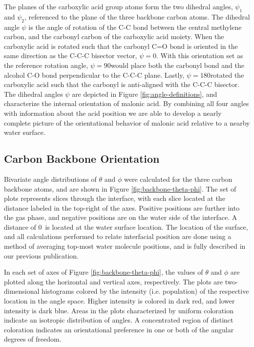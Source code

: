 The planes of the carboxylic acid group atoms form the two dihedral angles, $\psi_1$ and $\psi_2$, referenced to the plane of the three backbone carbon atoms. The dihedral angle $\psi$ is the angle of rotation of the C-C bond between the central methylene carbon, and the carbonyl carbon of the carboxylic acid moiety. When the carboxylic acid is rotated such that the carbonyl C=O bond is oriented in the same direction as the C-C-C bisector vector, $\psi=0$\textdegree. With this orientation set as the reference rotation angle, $\psi=90$\textdegree would place both the carbonyl bond and the alcohol C-O bond perpendicular to the C-C-C plane. Lastly, $\psi=180$\textdegree rotated the carboxylic acid such that the carbonyl is anti-aligned with the C-C-C bisector. The dihedral angles $\psi$ are depicted in Figure \ref{fig:angle-definitions}, and characterize the internal orientation of malonic acid. By combining all four angles with information about the acid position we are able to develop a nearly complete picture of the orientational behavior of malonic acid relative to a nearby water surface.



\subsection {Carbon Backbone Orientation}

Bivariate angle distributions of $\theta$ and $\phi$ were calculated for the three carbon backbone atoms, and are shown in Figure \ref{fig:backbone-theta-phi}. The set of plots represents slices through the interface, with each slice located at the distance labeled in the top-right of the axes. Positive positions are further into the gas phase, and negative positions are on the water side of the interface. A distance of 0\angs~is located at the water surface location. The location of the surface, and all calculations performed to relate interfacial position are done using a method of averaging top-most water molecule positions, and is fully described in our previous publication.\cite{Shamay2011}

In each set of axes of Figure \ref{fig:backbone-theta-phi}, the values of $\theta$ and $\phi$ are plotted along the horizontal and vertical axes, respectively. The plots are two-dimensional histograms colored by the intensity (i.e. population) of the respective location in the angle space. Higher intensity is colored in dark red, and lower intensity is dark blue. Areas in the plots characterized by uniform coloration indicate an isotropic distribution of angles. A concentrated region of distinct coloration indicates an orientational preference in one or both of the angular degrees of freedom.

